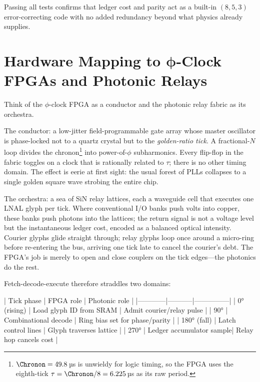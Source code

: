\documentclass[11pt,oneside]{book}
\begin{document}
Passing all tests confirms that ledger cost and parity act as a
built-in \((8,5,3)\) error-correcting code with no added redundancy
beyond what physics already supplies.


\section{Hardware Mapping to $\boldsymbol{\phi}$-Clock FPGAs and Photonic Relays}
\label{sec:hardware-mapping-narrative}

Think of the $\phi$-clock FPGA as a conductor and the photonic relay
fabric as its orchestra.

The conductor: a low-jitter field-programmable gate array whose master
oscillator is phase-locked not to a quartz crystal but to the
\emph{golden-ratio tick}.  A fractional-$N$ loop divides the
chronon\footnote{$\Chronon=49.8$\,µs is unwieldy for logic timing, so
the FPGA uses the eighth-tick $\tau=\Chronon/8=6.225$\,µs as its raw
period.} into power-of-$\phi$ subharmonics.  Every flip-flop in the
fabric toggles on a clock that is rationally related to $\tau$; there
is no other timing domain.  The effect is eerie at first sight: the
usual forest of PLLs collapses to a single golden square wave strobing
the entire chip.

The orchestra: a sea of SiN relay lattices, each a waveguide cell that
executes one LNAL glyph per tick.  Where conventional I/O banks push
volts into copper, these banks push photons into the lattices; the
return signal is not a voltage level but the instantaneous ledger
cost, encoded as a balanced optical intensity.  Courier glyphs glide
straight through; relay glyphs loop once around a micro-ring before
re-entering the bus, arriving one tick late to cancel the courier’s
debt.  The FPGA’s job is merely to open and close couplers on the tick
edges—the photonics do the rest.

Fetch-decode-execute therefore straddles two domains:

| Tick phase | FPGA role | Photonic role |
|------------|-----------|---------------|
| 0° (rising) | Load glyph ID from SRAM | Admit courier/relay pulse |
| 90°        | Combinational decode     | Ring bias set for phase/parity |
| 180° (fall) | Latch control lines     | Glyph traverses lattice |
| 270°       | Ledger accumulator sample| Relay hop cancels cost |
\end{document}
